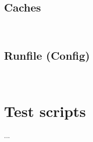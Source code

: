 \documentclass[12pt,twoside]{reedthesis}
\begin{document}
\subsection*{Caches}
%
\;\\

\subsection*{Runfile (Config)}
%
\;\\

\section{Test scripts}

...

\backmatter %

\nocite{*}
\printbibliography[title=References]
\end{document}
